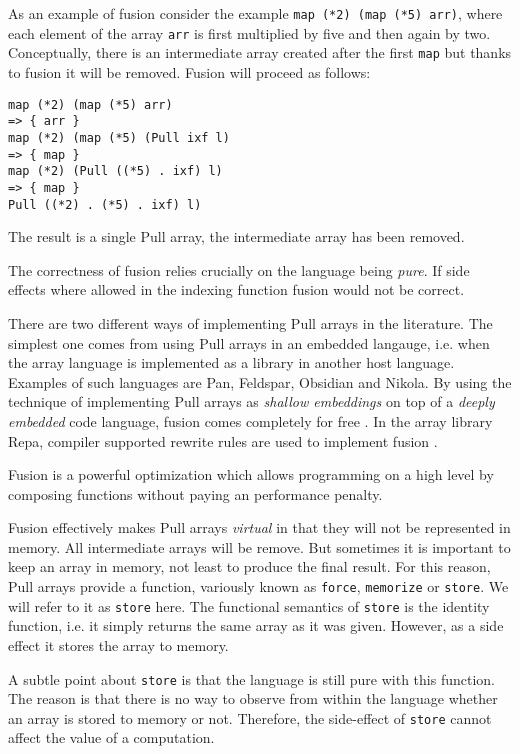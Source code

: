 \documentclass{sigplanconf}
\begin{document}
As an example of fusion consider the example
\verb!map (*2) (map (*5) arr)!, where each element of the array
\verb!arr! is first multiplied by five and then again by
two. Conceptually, there is an intermediate array created after the
first \verb!map! but thanks to fusion it will be removed. Fusion will proceed
as follows:

\begin{verbatim}
map (*2) (map (*5) arr)
=> { arr }
map (*2) (map (*5) (Pull ixf l)
=> { map }
map (*2) (Pull ((*5) . ixf) l)
=> { map }
Pull ((*2) . (*5) . ixf) l)
\end{verbatim}

The result is a single Pull array, the intermediate array has been removed.

The correctness of fusion relies crucially on the language being
\emph{pure}. If side effects where allowed in the indexing function
fusion would not be correct.

There are two different ways of implementing Pull arrays in the
literature. The simplest one comes from using Pull arrays in an
embedded langauge, i.e. when the array language is implemented as a
library in another host language. Examples of such languages are
Pan\cite{elliott2003compiling}, Feldspar\cite{Axelsson:2010:Feldspar},
Obsidian\cite{Svensson:2011:Obsidian} and
Nikola\cite{Mainland:2010:Nikola}. By using the technique of
implementing Pull arrays as \emph{shallow embeddings} on top of a
\emph{deeply embedded} code language, fusion comes completely for free
\cite{svenningsson2013combining}.
In the array library Repa\cite{keller2010regular}, compiler supported
rewrite rules are used to implement fusion \cite{jones2001playing}.

Fusion is a powerful optimization which allows programming on a high
level by composing functions without paying an performance penalty.

Fusion effectively makes Pull arrays \emph{virtual} in that they will
not be represented in memory. All intermediate arrays will be
remove. But sometimes it is important to keep an array in memory, not
least to produce the final result. For this reason, Pull arrays
provide a function, variously known as \verb!force!, \verb!memorize!
  or \verb!store!. We will refer to it as \verb!store! here. The
  functional semantics of \verb!store! is the identity function,
  i.e. it simply returns the same array as it was given. However, as a
  side effect it stores the array to memory.

A subtle point about \verb!store! is that the language is still pure
with this function. The reason is that there is no way to observe from
within the language whether an array is stored to memory or
not. Therefore, the side-effect of \verb!store! cannot affect the
value of a computation.
\end{document}
